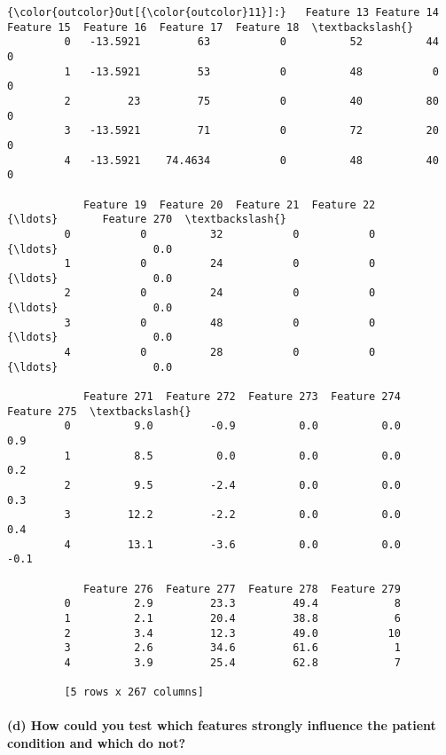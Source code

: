 \documentclass{article}
\begin{document}
            \begin{Verbatim}[commandchars=\\\{\}]
{\color{outcolor}Out[{\color{outcolor}11}]:}   Feature 13 Feature 14  Feature 15  Feature 16  Feature 17  Feature 18  \textbackslash{}
         0   -13.5921         63           0          52          44           0   
         1   -13.5921         53           0          48           0           0   
         2         23         75           0          40          80           0   
         3   -13.5921         71           0          72          20           0   
         4   -13.5921    74.4634           0          48          40           0   
         
            Feature 19  Feature 20  Feature 21  Feature 22     {\ldots}       Feature 270  \textbackslash{}
         0           0          32           0           0     {\ldots}               0.0   
         1           0          24           0           0     {\ldots}               0.0   
         2           0          24           0           0     {\ldots}               0.0   
         3           0          48           0           0     {\ldots}               0.0   
         4           0          28           0           0     {\ldots}               0.0   
         
            Feature 271  Feature 272  Feature 273  Feature 274  Feature 275  \textbackslash{}
         0          9.0         -0.9          0.0          0.0          0.9   
         1          8.5          0.0          0.0          0.0          0.2   
         2          9.5         -2.4          0.0          0.0          0.3   
         3         12.2         -2.2          0.0          0.0          0.4   
         4         13.1         -3.6          0.0          0.0         -0.1   
         
            Feature 276  Feature 277  Feature 278  Feature 279  
         0          2.9         23.3         49.4            8  
         1          2.1         20.4         38.8            6  
         2          3.4         12.3         49.0           10  
         3          2.6         34.6         61.6            1  
         4          3.9         25.4         62.8            7  
         
         [5 rows x 267 columns]
\end{Verbatim}
        
    \paragraph{(d) How could you test which features strongly influence the
patient condition and which do
not?}\label{d-how-could-you-test-which-features-strongly-influence-the-patient-condition-and-which-do-not}
\end{document}
